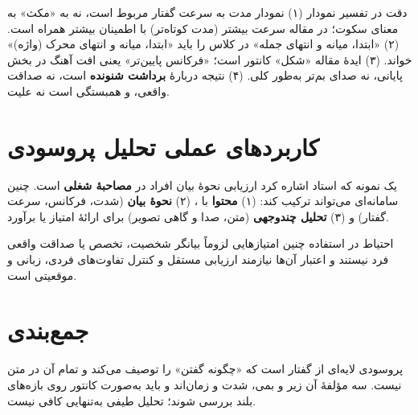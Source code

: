 \begin{correctionbox}{دقت در تفسیر نمودار}
(۱) نمودار مدت به سرعت گفتار مربوط است، نه به «مکث» به معنای سکوت؛ در مقاله سرعت بیشتر (مدت کوتاه‌تر) با اطمینان بیشتر همراه است. (۲) «ابتدا، میانه و انتهای جمله» در کلاس را باید «ابتدا، میانه و انتهای محرک (واژه)» خواند. (۳) ایدهٔ مقاله «شکل» کانتور است؛ «فرکانس پایین‌تر» یعنی افت آهنگ در بخش پایانی، نه صدای بم‌تر به‌طور کلی. (۴) نتیجه دربارهٔ \textbf{برداشت شنونده} است، نه صداقت واقعی، و همبستگی است نه علیت.
\end{correctionbox}

\section{کاربردهای عملی تحلیل پروسودی}

یک نمونه که استاد اشاره کرد ارزیابی نحوهٔ بیان افراد در \textbf{مصاحبهٔ شغلی} است. چنین سامانه‌ای می‌تواند ترکیب کند: (۱) \textbf{محتوا} با ، (۲) \textbf{نحوهٔ بیان} (شدت، فرکانس، سرعت گفتار) و (۳) \textbf{تحلیل چندوجهی} (متن، صدا و گاهی تصویر) برای ارائهٔ امتیاز یا برآورد.

\begin{warningbox}{احتیاط در استفاده}
چنین امتیازهایی لزوماً بیانگر شخصیت، تخصص یا صداقت واقعی فرد نیستند و اعتبار آن‌ها نیازمند ارزیابی مستقل و کنترل تفاوت‌های فردی، زبانی و موقعیتی است.
\end{warningbox}

\section{جمع‌بندی}

پروسودی لایه‌ای از گفتار است که «چگونه گفتن» را توصیف می‌کند و تمام آن در متن نیست. سه مؤلفهٔ آن زیر و بمی، شدت و زمان‌اند و باید به‌صورت کانتور روی بازه‌های بلند بررسی شوند؛ تحلیل طیفی به‌تنهایی کافی نیست.

